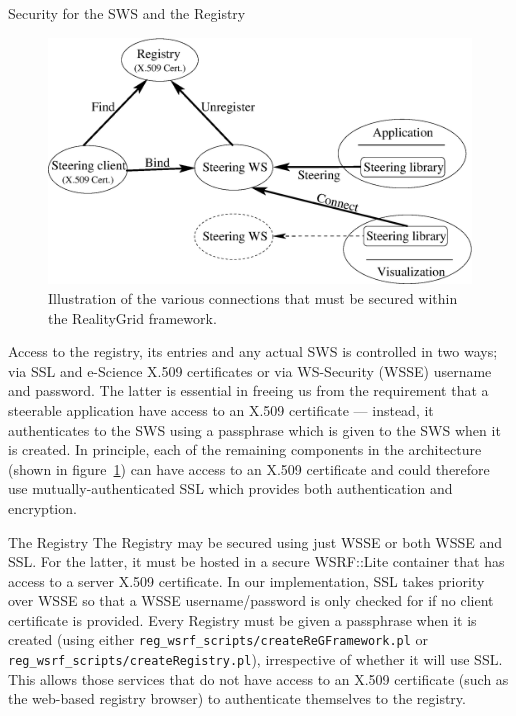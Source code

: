 \documentclass[a4paper]{article}
\begin{document}

\begin{section}{Security for the SWS and the Registry}
\label{sec:security}

\begin{figure}
\begin{center}
\includegraphics[width=14.0cm]{steer_ws_security.eps}
\end{center}
\caption{Illustration of the various connections that must be secured
within the RealityGrid framework.}
\label{fig:arch}
\end{figure}
Access to the registry, its entries and any actual SWS is controlled in
two ways; via SSL and e-Science X.509 certificates or via WS-Security
(WSSE) username and password.  The latter is essential in freeing us from
the requirement that a steerable application have access to an X.509 
certificate --- instead, it authenticates to the SWS using a passphrase
which is given to the SWS when it is created. In principle, each of
the remaining components in the architecture (shown in figure~\ref{fig:arch})
can have access to an
X.509 certificate and could therefore use mutually-authenticated SSL
which provides both authentication and encryption.

\begin{subsection}{The Registry}
The Registry may be secured using just WSSE or both WSSE and SSL.  For the
latter, it must be hosted in a secure WSRF::Lite container that has access to
a server X.509 certificate.  In our implementation, SSL takes priority over
WSSE so that a WSSE username/password is only checked for if no client
certificate is provided.  Every Registry must be given a passphrase when
it is created (using either \texttt{reg\_wsrf\_scripts/createReGFramework.pl}
or \texttt{reg\_wsrf\_scripts/createRegistry.pl}), irrespective of whether 
it will use SSL.  This allows those
services that do not have access to an X.509 certificate (such as the web-based
registry browser) to authenticate
themselves to the registry.
\end{subsection}


\end{section}
\end{document}
